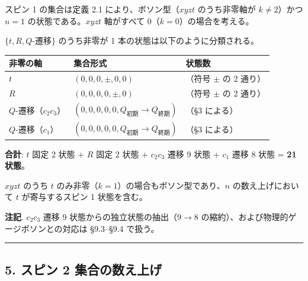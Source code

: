 \documentclass[
  a4paper,11pt]{ltjsarticle}
\newcounter{none}
\theoremstyle{definition}
\theoremstyle{remark}
\begin{document}
スピン 1 の集合は定義 2.1 により、ボソン型（\(xyzt\) のうち非零軸が
\(k \neq 2\)）かつ \(n = 1\) の状態である。\(xyzt\) 軸がすべて
\(0\)（\(k = 0\)）の場合を考える。

\(\{t, R, Q\text{-遷移}\}\) のうち非零が 1
本の状態は以下のように分類される。

{\def\LTcaptype{none} %
\begin{longtable}[]{@{}
  >{\raggedright\arraybackslash}p{}
  >{\raggedright\arraybackslash}p{}
  >{\centering\arraybackslash}p{}@{}}
\toprule\noalign{}
\begin{minipage}[b]{\linewidth}\raggedright
非零の軸
\end{minipage} & \begin{minipage}[b]{\linewidth}\raggedright
集合形式
\end{minipage} & \begin{minipage}[b]{\linewidth}\centering
状態数
\end{minipage} \\
\midrule\noalign{}
\endhead
\bottomrule\noalign{}
\endlastfoot
\(t\) & \((0, 0, 0, \pm, 0, 0)\) & 2（符号 \(\pm\) の 2 通り） \\
\(R\) & \((0, 0, 0, 0, \pm, 0)\) & 2（符号 \(\pm\) の 2 通り） \\
\(Q\)-遷移（\(c_2 c_3\)） &
\((0, 0, 0, 0, 0, Q_\text{初期} \to Q_\text{終期})\) & 9（§3 による） \\
\(Q\)-遷移（\(c_1\)） &
\((0, 0, 0, 0, 0, Q_\text{初期} \to Q_\text{終期})\) & 8（§3 による） \\
\end{longtable}
}

\textbf{合計}: \(t\) 固定 2 状態 + \(R\) 固定 2 状態 + \(c_2 c_3\) 遷移
9 状態 + \(c_1\) 遷移 8 状態 = \textbf{21 状態}。

\(xyzt\) のうち \(t\) のみ非零（\(k = 1\)）の場合もボソン型であり、\(n\)
の数え上げにおいて \(t\) が寄与するスピン 1 状態を含む。

\textbf{注記}. \(c_2 c_3\) 遷移 9 状態からの独立状態の抽出（\(9 \to 8\)
の縮約）、および物理的ゲージボソンとの対応は §9.3--§9.4 で扱う。

\begin{center}\rule{0.5\linewidth}{0.5pt}\end{center}

\subsection{5. スピン 2
集合の数え上げ}\label{ux30b9ux30d4ux30f3-2-ux96c6ux5408ux306eux6570ux3048ux4e0aux3052}
\end{document}
